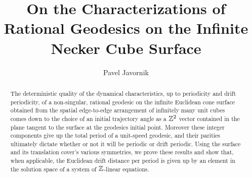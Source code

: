 \documentclass[a4paper, 11pt]{article}
\begin{document}
\newtheorem{thm}{Theorem}[]
\newtheorem{Def}{Definition}[]
\newtheorem*{thm*}{Theorem}
\newtheorem*{def*}{Definition}
\newtheorem{lem}{Lemma}
\newtheorem*{rem}{Remark}
\newcommand{\shiftleft}[2]{\makebox[0pt][r]{\makebox[#1][l]{#2}}}
\newtheorem*{conj}{Conjecture}
\newtheorem{cor}{Corollary}[]

\newcommand{\compav}[1]{\textbf{\textcolor{blue}{#1}}}
\newcommand{\compat}[1]{\textbf{\textcolor{red}{#1}}}
\graphicspath{{images/}}


\setlength{\topmargin}{1in} %
\setlength{\oddsidemargin}{\topmargin} %

\setlength{\textheight}{11in} \setlength{\textwidth}{8.5in}
\setlength{\hoffset}{-1in} \setlength{\voffset}{-1in} \setlength{\evensidemargin}{\oddsidemargin} \addtolength{\textheight}{-2 \topmargin}\addtolength{\textwidth}{-2\oddsidemargin}
\setlength{\headheight}{0pt} \setlength{\headsep}{20pt} \setlength{\footskip}{20pt}
\addtolength{\textheight}{-\footskip} \addtolength{\textheight}{-\headheight} \addtolength{\textheight}{-\headsep}


\title{On the Characterizations of Rational Geodesics on the Infinite Necker Cube Surface}
\author{Pavel Javornik}
\date{}
\maketitle

%
\begin{abstract}
\noindent The deterministic quality of the dynamical characteristics, up to periodicity and drift periodicity, of a non-singular, rational geodesic on the infinite Euclidean cone surface obtained from the spatial edge-to-edge arrangement of infinitely many unit cubes comes down to the choice of an initial trajectory angle as a $\mathbb{Z}^2$ vector contained in the plane tangent to the surface at the geodesics initial point. Moreover these integer components give up the total period of a unit-speed geodesic, and their parities ultimately dictate whether or not it will be periodic or drift periodic. Using the surface and its translation cover's various symmetries, we prove these results and show that, when applicable, the Euclidean drift distance per period is given up by an element in the solution space of a system of $\mathbb{Z}$-linear equations.
\end{abstract}
\end{document}
